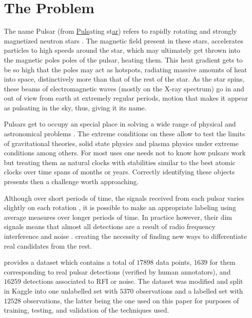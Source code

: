 \documentclass[conference]{IEEEtran}
\begin{document}
\section{The Problem\label{sec:problem}}
The name Pulsar (from \underline{Puls}ating st\underline{ar}) refers to rapidly
rotating and strongly magnetized neutron stars \cite{pulsar:definition:nasa}.
The magnetic field present in these stars, accelerates particles to high
speeds around the star, which may ultimately get thrown into the magnetic
poles poles of the pulsar, heating them. This heat gradient gets to be so high
that the poles may act as hotspots, radiating massive amounts of heat into space,
distinctively more than that of the rest of the star. As the star spins,
these beams of electromagnetic waves (mostly on the X-ray spectrum) go in and out
of view from earth at extremely regular periods, motion that makes it appear as
pulsating in the sky, thus, giving it its name.

Pulsars get to occupy an special place in solving a wide range of physical and
astronomical problems \cite{pulsar:importance:kramer}. The extreme conditions on
these allow to test the limits of gravitational theories, solid state physics and
plasma physics under extreme conditions among others. For most uses one needs
not to know how pulsars work but treating them as natural clocks with stabilities
similar to the best atomic clocks over time spans of months or years.
Correctly identifying these objects presents then a challenge worth approaching.

Although over short periods of time, the signals received from each pulsar
varies slightly on each rotation \cite{pulsar:importance:kramer}, it is possible
to make an appropriate labeling using average measures over longer periods of time.
In practice however, their dim signals means that almost all detections are a
result of radio frequency interference and noise \cite{pulsar:dataset:explanation:lyon}.
creating the necessity of finding new ways to differentiate real candidates
from the rest.

\citet{pulsar:dataset:lyon} provides a dataset which contains a total of $17898$
data points, $1639$ for them corresponding to real pulsar detections (verified
by human annotators), and $16259$ detections associated to RFI or noise.
The dataset was modified and split in Kaggle \cite{pulsar:dataset:kaggle} into one
unlabelled set with $5370$ observations and a labelled set with $12528$ observations,
the latter being the one used on this paper for purposes of training, testing,
and validation of the techniques used.
\end{document}
